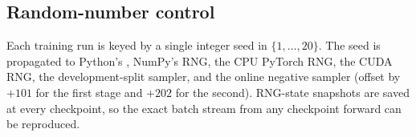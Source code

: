 \subsection{Random-number control}

Each training run is keyed by a single integer seed in $\{1, \ldots, 20\}$.
The seed is propagated to Python's , NumPy's RNG, the
CPU PyTorch RNG, the CUDA RNG, the development-split sampler, and
the online negative sampler (offset by $+101$ for the first stage and
$+202$ for the second). RNG-state snapshots are saved at every
checkpoint, so the exact batch stream from any checkpoint forward
can be reproduced.